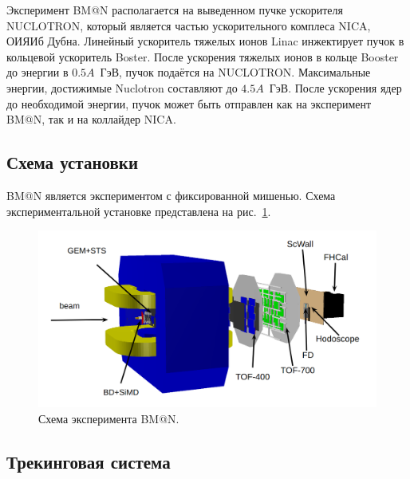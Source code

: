 Эксперимент BM@N располагается на выведенном пучке ускорителя NUCLOTRON, который является частью ускорительного комплеса NICA, ОИЯИб Дубна.
Линейный ускоритель тяжелых ионов Linac инжектирует пучок в кольцевой ускоритель Boster.
После ускорения тяжелых ионов в кольце Booster до энергии в $0.5A$~ГэВ, пучок подаётся на NUCLOTRON.
Максимальные энергии, достижимые Nuclotron составляют до $4.5A$~ГэВ.
После ускорения ядер до необходимой энергии, пучок может быть отправлен как на эксперимент BM@N, так и на коллайдер NICA.

\subsection{Схема установки}

BM@N является экспериментом с фиксированной мишенью.
Схема экспериментальной установке представлена на рис.~\ref{fig:bmn_layout}.
%
\begin{figure}[ht]
\begin{center}
\includegraphics[width=0.95\linewidth]{images/BM@N_layout.png}
\caption{Схема эксперимента BM@N.}
\label{fig:bmn_layout}
\end{center}
\end{figure}

\subsection{Трекинговая система}

